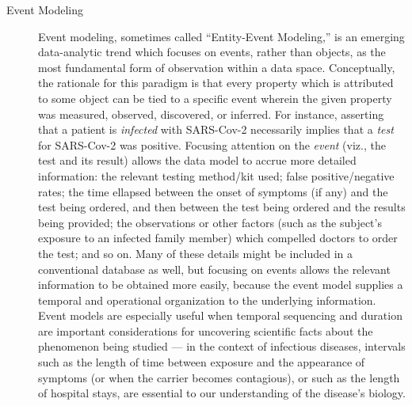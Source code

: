\documentclass[11pt,letterpaper]{article}
\newcommand{\q}[1]{{\fontfamily{qcr}\selectfont ``}#1{\fontfamily{qcr}\selectfont ''}}
\begin{document}
{{\begin{description}
\item[Event Modeling]  Event modeling, sometimes called 
\q{Entity-Event Modeling,} is an emerging data-analytic 
trend which focuses on events, rather than objects, 
as the most fundamental form of observation within a data 
space.  Conceptually, the rationale for this paradigm 
is that every property which is attributed to 
some object can be 
tied to a specific event wherein the given property was 
measured, observed, discovered, or inferred.  
For instance, asserting that a patient is 
\textit{infected} with SARS-Cov-2 necessarily 
implies that a \textit{test} for SARS-Cov-2 
was positive.  Focusing attention on the \textit{event} 
(viz., the test and its result) allows the 
data model to accrue more detailed information: 
the relevant testing method/kit used; false 
positive/negative rates; the time ellapsed between the 
onset of symptoms (if any) and the test being ordered, 
and then between the test being ordered and 
the results being provided; the observations 
or other factors (such as the subject's exposure 
to an infected family member) which 
compelled doctors to order the test; and so on.  
Many of these details might be included in a conventional 
database as well, but focusing on events allows the 
relevant information to be obtained more easily, because 
the event model supplies a temporal and operational 
organization to the underlying information.  
Event models are especially useful when 
temporal sequencing and duration are important 
considerations for uncovering scientific 
facts about the phenomenon being studied --- in the 
context of infectious diseases, intervals such 
as the length of time between exposure and the 
appearance of symptoms (or when the carrier becomes 
contagious), or such as the length of hospital stays, 
are essential to our understanding of the disease's 
biology. 


\end{description}}}
\end{document}
